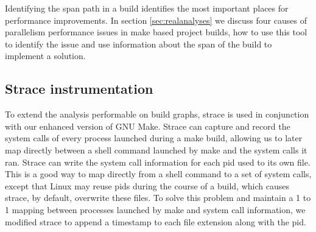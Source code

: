 \documentclass[sigconf,10pt,review,authorversion]{acmart}\settopmatter{printfolios=true,printccs=false,printacmref=false}
\begin{document}
Identifying the span path in a build identifies the most important places for performance
improvements.  In section \ref{sec:realanalyses} we discuss four causes of parallelism
performance issues in make based project builds, how to use this tool to identify the
issue and use information about the span of the build to implement a solution.





\subsection{Strace instrumentation}
\label{sec:straceinstr}

To extend the analysis performable on build graphs, strace \cite{strace4.25} is used in
conjunction with our enhanced version of GNU Make.  Strace can capture and record the system
calls of every process launched during a make build, allowing us to later map directly between
a shell command launched by make and the system calls it ran.  Strace can write the system call
information for each pid used to its own file.  This is a good way to map directly from a
shell command to a set of system calls, except that Linux may reuse pids during the course of
a build, which causes strace, by default, overwrite these files.  To solve this problem and
maintain a 1 to 1 mapping between processes launched by make and system call information,
we modified strace to append a timestamp to each file extension along with the pid.
\end{document}
